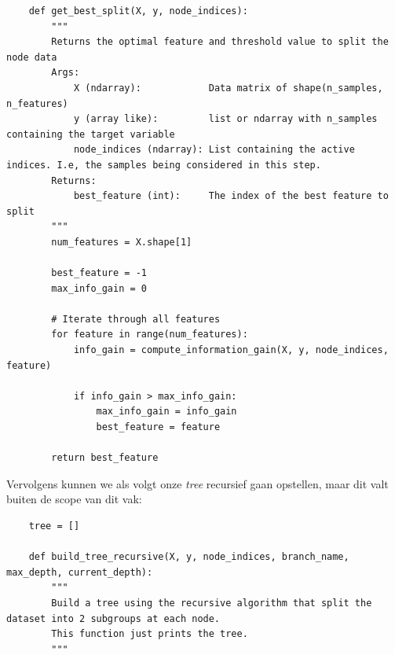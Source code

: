 \begin{lstlisting}
	def get_best_split(X, y, node_indices):
	    """
	    Returns the optimal feature and threshold value to split the node data
	    Args:
	        X (ndarray):            Data matrix of shape(n_samples, n_features)
	        y (array like):         list or ndarray with n_samples containing the target variable
	        node_indices (ndarray): List containing the active indices. I.e, the samples being considered in this step.
	    Returns:
	        best_feature (int):     The index of the best feature to split
	    """
	    num_features = X.shape[1]
	
	    best_feature = -1
	    max_info_gain = 0
	
	    # Iterate through all features
	    for feature in range(num_features):
	        info_gain = compute_information_gain(X, y, node_indices, feature)
	
	        if info_gain > max_info_gain:  
	            max_info_gain = info_gain 
	            best_feature = feature
	
	    return best_feature
\end{lstlisting}
\noindent
Vervolgens kunnen we als volgt onze \textit{tree} recursief gaan opstellen, maar dit valt buiten de scope van dit vak:
\begin{lstlisting}
	tree = []
	
	def build_tree_recursive(X, y, node_indices, branch_name, max_depth, current_depth):
	    """
	    Build a tree using the recursive algorithm that split the dataset into 2 subgroups at each node.
	    This function just prints the tree.
	    """
\end{lstlisting}
\newpage
